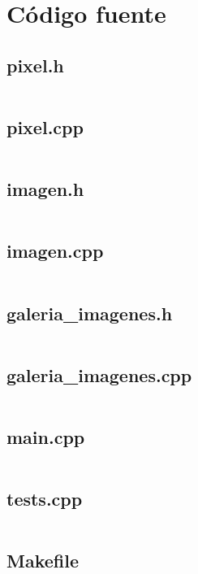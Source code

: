 \documentclass[10pt,a4paper,spanish]{article}
\begin{document}
\newpage
\section{Código fuente}

\subsection{pixel.h}
\inputminted[linenos]{cpp}{../src/pixel.h}

\newpage
\subsection{pixel.cpp}
\inputminted[linenos]{cpp}{../src/pixel.cpp}

\newpage
\subsection{imagen.h}
\inputminted[linenos]{cpp}{../src/imagen.h}

\newpage
\subsection{imagen.cpp}
\inputminted[linenos]{cpp}{../src/imagen.cpp}

\newpage
\subsection{galeria_imagenes.h}
\inputminted[linenos]{cpp}{../src/galeria_imagenes.h}

\newpage
\subsection{galeria_imagenes.cpp}
\inputminted[linenos]{cpp}{../src/galeria_imagenes.cpp}

\newpage
\subsection{main.cpp}
\inputminted[linenos]{cpp}{../src/main.cpp}

\newpage
\subsection{tests.cpp}
\inputminted[linenos]{cpp}{../src/tests.cpp}

\newpage
\subsection{Makefile}
\begin{alltt}
	
\end{alltt}
\end{document}
